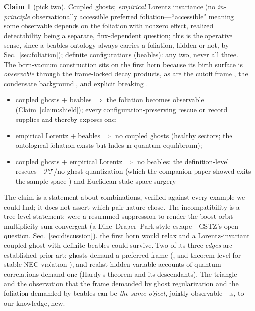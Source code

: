 \documentclass[11pt]{article}
\theoremstyle{definition}
\newtheorem{claim}[theorem]{Claim}
\theoremstyle{remark}
\newcommand{\PT}{\mathcal{PT}}
\begin{document}
\begin{claim}[pick two]
\label{claim:trilemma}
Coupled ghosts; \emph{empirical} Lorentz invariance (no \emph{in-principle} observationally
accessible preferred foliation---``accessible'' meaning some observable depends on the foliation with nonzero effect, realized detectability being a separate, flux-dependent question; this is the operative sense, since a
beables ontology always carries a foliation, hidden or not, by
Sec.~\ref{sec:foliation}); definite configurations (beables): any
two, never all three. The born-vacuum construction \cite{GV2013}
sits on the first horn because its birth surface is
\emph{observable} through the frame-locked decay products, as are
the cutoff frame \cite{CJM2004}, the condensate background
\cite{GhostCondensate}, and explicit breaking \cite{Horava-ghosts}.
\begin{itemize}
\item coupled ghosts $+$ beables $\Rightarrow$ the foliation becomes
observable (Claim~\ref{claim:shield}); every configuration-preserving rescue on record
supplies and thereby exposes one;
\item empirical Lorentz $+$ beables $\Rightarrow$ no coupled ghosts
(healthy sectors; the ontological foliation exists but hides in
quantum equilibrium);
\item coupled ghosts $+$ empirical Lorentz $\Rightarrow$ no beables: the
definition-level rescues---$\PT$/no-ghost quantization
\cite{BenderMannheim2008} (which the companion paper showed exits the
sample space \cite{indivisible}) and Euclidean state-space surgery
\cite{HawkingHertog}.
\end{itemize}
The claim is a statement about combinations, verified against every
example we could find; it does not assert which pair nature chose. The incompatibility is a tree-level statement: were a resummed suppression to render the boost-orbit multiplicity sum convergent (a Dine--Draper--Park-style escape---GSTZ's open question, Sec.~\ref{sec:discussion}), the first horn would relax and a Lorentz-invariant coupled ghost with definite beables could survive.
Two of its three \emph{edges} are established prior art: ghosts demand a
preferred frame (\cite{CJM2004}, and theorem-level for stable NEC
violation \cite{DubovskyNEC}), and realist hidden-variable accounts of quantum
correlations demand one (Hardy's theorem \cite{Hardy1992} and its
descendants). The triangle---and the observation that the frame
demanded by ghost regularization and the foliation demanded by
beables can be \emph{the same object}, jointly observable---is, to
our knowledge, new.
\end{claim}
\end{document}

